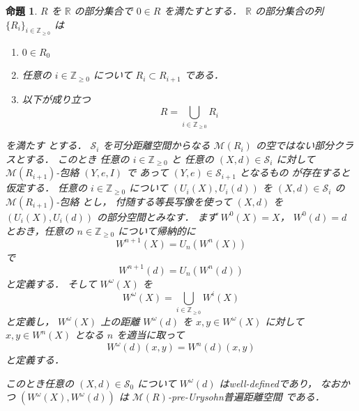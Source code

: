 \documentclass[leqno, 12pt]{jsarticle}
\newtheorem{prop}[thm]{命題}
\newcommand{\zz}{\mathbb{Z}}
\newcommand{\yozz}[1]{\zz_{\ge #1}}
\newcommand{\rr}{\mathbb{R}}
\newcommand{\Met}[1]{\mathscr{M}(#1)}
\newcommand{\Wstage}[2]{W^{#1}(#2)}
\begin{document}
\begin{prop}\label{prop:func:envlimitedext}
$R$
を
$\rr$
の部分集合で
$0\in R$
を満たすとする．
$\rr$
の部分集合の列%
$\{R_i\}_{i\in \yozz{0}}$
は
\begin{enumerate}[label=\textup{(\arabic*)}]
\item
$0\in R_{0}$
\item
任意の
$i\in \yozz{0}$
について
$R_{i}\subset R_{i+1}$%
である．
\item
以下が成り立つ
\[
R=\bigcup_{i\in \yozz{0}}R_{i}
\]
\end{enumerate}
を満たす
とする．
$\mathscr{S}_{i}$
を可分距離空間からなる
$\Met{R_{i}}$
の空ではない部分クラスとする．
このとき
任意の
$i\in \yozz{0}$
と
任意の
$(X, d)\in\mathscr{S}_{i}$
に対して
$\Met{R_{i+1}}$-包絡
$(Y, e, I)$
で
あって
$(Y, e)\in \mathscr{S}_{i+1}$
となるもの
が存在すると仮定する．
任意の
$i\in \yozz{0}$
について
$(U_{i}(X), U_{i}(d))$
を
$(X, d)\in \mathscr{S}_{i}$
の
$\Met{R_{i+1}}$-包絡
とし，
付随する等長写像を使って
$(X, d)$
を
$(U_{i}(X), U_{i}(d))$
の部分空間とみなす．
まず
$\Wstage{0}{X}=X$，
$\Wstage{0}{d}=d$
とおき，任意の
$n\in\yozz{0}$
について帰納的に
\[
\Wstage{n+1}{X}=U_{n}(\Wstage{n}{X})
\]
で
\[
\Wstage{n+1}{d}=U_{n}(\Wstage{n}{d})
\]
と定義する．
そして
$\Wstage{\omega}{X}$%
を
\[
\Wstage{\omega}{X}=\bigcup_{i\in \yozz{0}}\Wstage{i}{X}
\]
と定義し，
$\Wstage{\omega}{X}$
上の距離
$\Wstage{\omega}{d}$
を
$x, y\in \Wstage{\omega}{X}$
に対して
$x, y\in \Wstage{n}{X}$
となる
$n$
を適当に取って
\[
\Wstage{\omega}{d}(x, y)=
\Wstage{n}{d}(x, y)
\]
と定義する．




このとき任意の
$(X, d)\in \mathscr{S}_{0}$
について
$\Wstage{\omega}{d}$
はwell-definedであり，
なおかつ
$(\Wstage{\omega}{X}, \Wstage{\omega}{d})$
は
$\Met{R}$-pre-Urysohn普遍距離空間
である．
\end{prop}
\end{document}
